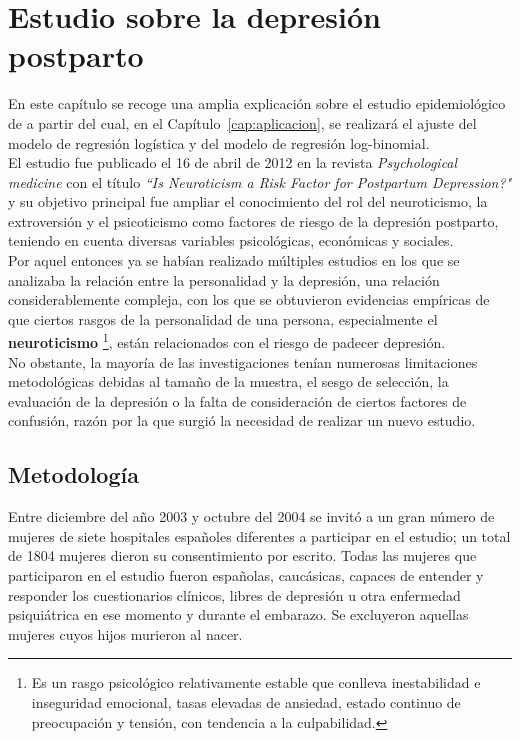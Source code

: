 \chapter{Estudio sobre la depresión postparto}\label{cap:estudioppal}

En este capítulo se recoge una amplia explicación sobre el estudio epidemiológico de \textcite{Estudioppal} a partir del cual, en el Capítulo~\ref{cap:aplicacion}, se realizará el ajuste del modelo de regresión logística y del modelo de regresión log-binomial.\\

El estudio fue publicado el 16 de abril de 2012 en la revista \textit{Psychological medicine} con el título \textit{``Is Neuroticism a Risk Factor for Postpartum Depression?"} y su objetivo principal fue ampliar el conocimiento del rol del neuroticismo, la extroversión y el psicoticismo como factores de riesgo de la depresión postparto, teniendo en cuenta diversas variables psicológicas, económicas y sociales.\\

Por aquel entonces ya se habían realizado múltiples estudios \parencites{otrosestudios1, otrosestudios2, otrosestudios3} en los que se analizaba la relación entre la personalidad y la depresión, una relación considerablemente compleja, con los que se obtuvieron evidencias empíricas de que ciertos rasgos de la personalidad de una persona, especialmente el \textbf{neuroticismo} \footnote{Es un rasgo psicológico relativamente estable que conlleva inestabilidad e inseguridad emocional, tasas elevadas de ansiedad, estado continuo de preocupación y tensión, con tendencia a la culpabilidad.}, están relacionados con el riesgo de padecer depresión. \\

No obstante, la mayoría de las investigaciones tenían numerosas limitaciones metodológicas debidas al tamaño de la muestra, el sesgo de selección, la evaluación de la depresión o la falta de consideración de ciertos factores de confusión, razón por la que surgió la necesidad de realizar un nuevo estudio. \\


\section{Metodología}\label{cap:metodologia}

Entre diciembre del año 2003 y octubre del 2004 se invitó a un gran número de mujeres de siete hospitales españoles diferentes a participar en el estudio; un total de 1804 mujeres dieron su consentimiento por escrito. Todas las mujeres que participaron en el estudio fueron españolas, caucásicas, capaces de entender y responder los cuestionarios clínicos, libres de depresión u otra enfermedad psiquiátrica en ese momento y durante el embarazo. Se excluyeron aquellas mujeres cuyos hijos murieron al nacer. \\

